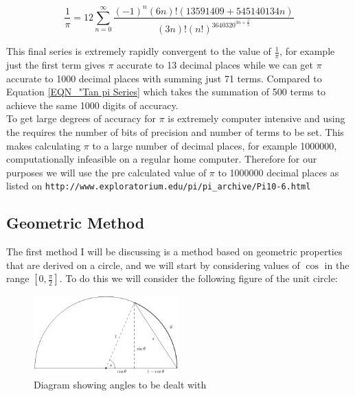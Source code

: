 \begin{equation}
\frac{1}{\pi} = 12\sum_{n=0}^\infty \frac{(-1)^n(6n)!(13591409 + 545140134n)}{(3n)!(n!)^3640320^{3n + \frac{3}{2}}}
\end{equation}

This final series is extremely rapidly convergent to the value of \(\frac{1}{\pi}\), for example just the first term gives \(\pi\) accurate to 13 decimal places while we can get \(\pi\) accurate to 1000 decimal places with summing just 71 terms. Compared to Equation \ref{EQN_"Tan pi Series} which takes the summation of 500 terms to achieve the same 1000 digits of accuracy.\\

To get large degrees of accuracy for \(\pi\) is extremely computer intensive and using the  requires the number of bits of precision and number of terms to be set. This makes calculating \(\pi\) to a large number of decimal places, for example 1000000, computationally infeasible on a regular home computer. Therefore for our purposes we will use the pre calculated value of \(\pi\) to 1000000 decimal places as listed on \texttt{http://www.exploratorium.edu/pi/pi\_archive/Pi10-6.html}

\subsection{Geometric Method}
\label{SUB_"Trig Geometric Method"}

\theoremstyle{plain}
\newtheorem{Geo Trig Prop 1}{Proposition}[subsection]
\newtheorem{Geo Trig Prop 2}[Geo Trig Prop 1]{Proposition}
\newtheorem{Geo Trig Prop 3}[Geo Trig Prop 1]{Proposition}

The first method I will be discussing is a method based on geometric properties that are derived on a circle, and we will start by considering values of \(\cos\) in the range \([0, \frac{\pi}{2}]\). To do this we will consider the following figure of the unit circle:

\begin{figure}[!ht]
	\label{FIG_"Geometric Trig 1"}
	\caption{Diagram showing angles to be dealt with}
	\centering
	\includegraphics[width=0.5\textwidth]{"./Diagrams/Geometric Trig Diagram 1"}
\end{figure}


